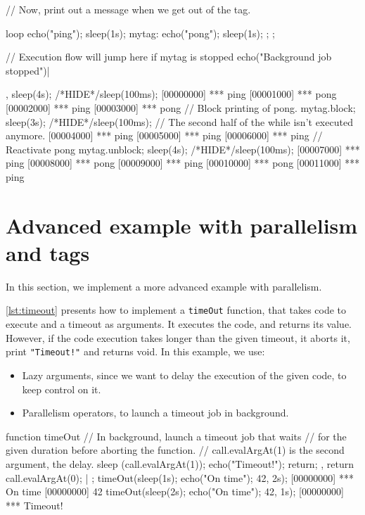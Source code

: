 \begin{urbiscript}[caption=Blocking chunks of code, label=lst:block]
// Now, print out a message when we get out of the tag.
{
  loop
  {
    echo("ping"); sleep(1s);
    mytag: { echo("pong"); sleep(1s); };
  };

  // Execution flow will jump here if mytag is stopped
  echo("Background job stopped")|
},
sleep(4s);
/*HIDE*/sleep(100ms);
[00000000] *** ping
[00001000] *** pong
[00002000] *** ping
[00003000] *** pong
// Block printing of pong.
mytag.block;
sleep(3s);
/*HIDE*/sleep(100ms);
// The second half of the while isn't executed anymore.
[00004000] *** ping
[00005000] *** ping
[00006000] *** ping
// Reactivate pong
mytag.unblock;
sleep(4s);
/*HIDE*/sleep(100ms);
[00007000] *** ping
[00008000] *** pong
[00009000] *** ping
[00010000] *** pong
[00011000] *** ping
\end{urbiscript}

\section{Advanced example with parallelism and tags}

In this section, we implement a more advanced example with
parallelism.

\autoref{lst:timeout} presents how to implement a \texttt{timeOut}
function, that takes code to execute and a timeout as arguments. It
executes the code, and returns its value. However, if the code
execution takes longer than the given timeout, it aborts it, print
\lstinline|"Timeout!"| and returns void. In this example, we use:

\begin{itemize}
\item Lazy arguments, since we want to delay the execution of the
  given code, to keep control on it.
\item Parallelism operators, to launch a timeout job in background.
\end{itemize}

\begin{urbiscript}[caption=Implementing a timeout method, label=lst:timeout]
function timeOut
{
  // In background, launch a timeout job that waits
  // for the given duration before aborting the function.
  // call.evalArgAt(1) is the second argument, the delay.
  {
    sleep (call.evalArgAt(1));
    echo("Timeout!");
    return;
  },
  return call.evalArgAt(0);
} | {};
timeOut({sleep(1s); echo("On time"); 42}, 2s);
[00000000] *** On time
[00000000] 42
timeOut({sleep(2s); echo("On time"); 42}, 1s);
[00000000] *** Timeout!
\end{urbiscript}

